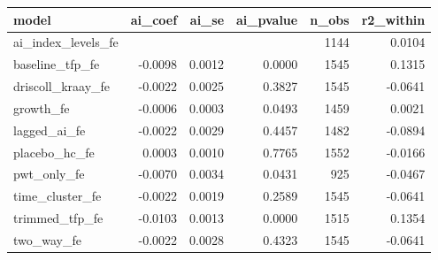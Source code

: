 \begin{tabular}{lrrrrr}
\hline
model & ai\_coef & ai\_se & ai\_pvalue & n\_obs & r2\_within \\
\hline
ai\_index\_levels\_fe &  &  &  & 1144 & 0.0104 \\
baseline\_tfp\_fe & -0.0098 & 0.0012 & 0.0000 & 1545 & 0.1315 \\
driscoll\_kraay\_fe & -0.0022 & 0.0025 & 0.3827 & 1545 & -0.0641 \\
growth\_fe & -0.0006 & 0.0003 & 0.0493 & 1459 & 0.0021 \\
lagged\_ai\_fe & -0.0022 & 0.0029 & 0.4457 & 1482 & -0.0894 \\
placebo\_hc\_fe & 0.0003 & 0.0010 & 0.7765 & 1552 & -0.0166 \\
pwt\_only\_fe & -0.0070 & 0.0034 & 0.0431 & 925 & -0.0467 \\
time\_cluster\_fe & -0.0022 & 0.0019 & 0.2589 & 1545 & -0.0641 \\
trimmed\_tfp\_fe & -0.0103 & 0.0013 & 0.0000 & 1515 & 0.1354 \\
two\_way\_fe & -0.0022 & 0.0028 & 0.4323 & 1545 & -0.0641 \\
\hline
\end{tabular}